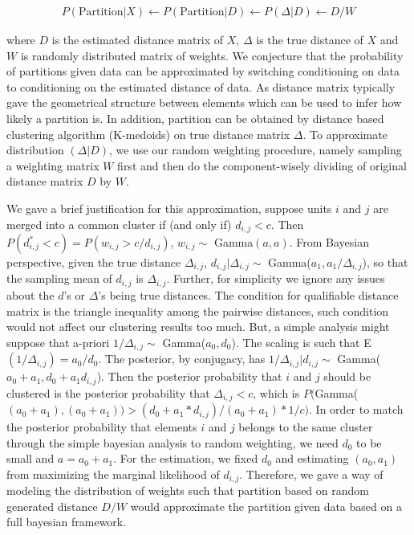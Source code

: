 \documentclass[aoas,preprint]{imsart}
\begin{document}
\begin{eqnarray*}
P(\text{Partition} | X) \leftarrow P(\text{Partition} | D) \leftarrow P(\Delta | D) \leftarrow D / W
\end{eqnarray*} 

where $D$ is the estimated distance matrix of $X$, $\Delta$ is the true distance of $X$ and $W$ is randomly distributed matrix of weights. We conjecture that the probability of partitions given data can be approximated by switching conditioning on data to conditioning on the estimated distance of data. As distance matrix typically gave the geometrical structure between elements which can be used to infer how likely a partition is.  In addition, partition can be obtained by  distance based clustering algorithm (K-medoids) on true distance matrix $\Delta$.  To approximate distribution $(\Delta | D)$, we use our random weighting procedure, namely sampling a weighting matrix $W$ first and then do the component-wisely dividing of original distance matrix $D$ by $W$.

We gave a brief justification for this approximation, suppose units $i$ and $j$ are merged into a common cluster if (and only if) $d_{i,j} < c$. Then $P(d^*_{i,j} < c) = P(w_{i,j} > c / d_{i,j})$, $w_{i,j} \sim$ Gamma$(a, a)$. From Bayesian perspective, given the true distance $\Delta_{i,j}$, $d_{i,j} | \Delta_{i,j} \sim$ Gamma($a_1, a_1 / \Delta_{i,j}$), so that the sampling mean of $d_{i,j}$ is $\Delta_{i,j}$.  Further, for simplicity we ignore any issues about the $d$'s or $\Delta$'s being true distances. The condition for qualifiable distance matrix is the triangle inequality among the pairwise distances, such condition would not affect our clustering results too much. But, a simple analysis might suppose that a-priori $1 / \Delta_{i,j} \sim$ Gamma($a_0, d_0$). The scaling is such that E$(1 / \Delta_{i,j}) = a_0 /  d_0$. The posterior, by conjugacy, has $1 / \Delta_{i,j} | d_{i,j} \sim$ Gamma($a_0 + a_1, d_0 + a_1d_{i,j}$). Then the posterior probability that $i$ and $j$ should be clustered is the posterior probability that $\Delta_{i,j} < c$, which is $P($Gamma($(a_0 + a_1),(a_0 + a_1)) > (d_0 + a_1 * d_{i,j}) / (a_0 + a_1) * 1/c )$. In order to match the posterior probability that elements $i$ and $j$ belongs to the same cluster through the simple bayesian analysis to random weighting, we need $d_0$ to be small and $a = a_0 + a_1$. For the estimation, we fixed $d_0$ and estimating $(a_0, a_1)$ from maximizing the marginal likelihood of $d_{i,j}$.
Therefore, we gave a way of modeling the distribution of weights such that partition based on random generated distance $D / W$ would approximate the partition given data based on a full bayesian framework.
\end{document}

